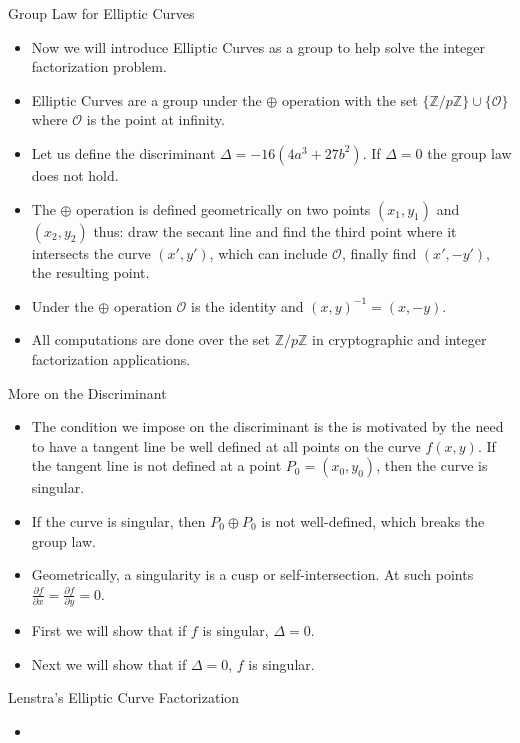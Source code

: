 \documentclass{beamer}
\begin{document}
	\begin{frame}{Group Law for Elliptic Curves}
		\begin{itemize}
			\item Now we will introduce Elliptic Curves as a group to help solve the integer factorization problem.
			\item Elliptic Curves are a group under the $\oplus$ operation with the set $\lbrace \mathbb{Z}/p\mathbb{Z} \rbrace \cup \lbrace \mathcal{O} \rbrace$ where $\mathcal{O}$ is the point at infinity.
			\item Let us define the discriminant $\Delta = -16(4a^3+27b^2)$. If $\Delta = 0$ the group law does not hold.
			\item The $\oplus$ operation is defined geometrically on two points $(x_1,y_1)$ and $(x_2,y_2)$ thus: draw the secant line and find the third point where it intersects the curve $(x',y')$, which can include $\mathcal{O}$, finally find $(x',-y')$, the resulting point.
			\item Under the $\oplus$ operation $\mathcal{O}$ is the identity and $(x,y)^{-1}=(x,-y)$.
			\item All computations are done over the set $\mathbb{Z}/p\mathbb{Z}$ in cryptographic and integer factorization applications.
		\end{itemize}
	\end{frame}
	
	\begin{frame}{More on the Discriminant}
		\begin{itemize}
			\item The condition we impose on the discriminant is the is motivated by the need to have a tangent line be well defined at all points on the curve $f(x,y)$. If the tangent line is not defined at a point $P_0=(x_0,y_0)$, then the curve is singular.
			\item If the curve is singular, then $P_0 \oplus P_0$ is not well-defined, which breaks the group law.
			\item Geometrically, a singularity is a cusp or self-intersection. At such points $\frac{\partial f}{\partial x}=\frac{\partial f}{\partial y}=0$.
			\item First we will show that if $f$ is singular, $\Delta=0$.
			\item Next we will show that if $\Delta=0$, $f$ is singular.
		\end{itemize}
	\end{frame}
	
	\begin{frame}{Lenstra's Elliptic Curve Factorization}
		\begin{itemize}
			\item 
		\end{itemize}
	\end{frame}
\end{document}
